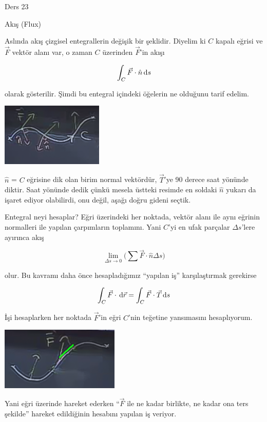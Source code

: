 \documentclass[12pt,fleqn]{article}\usepackage{../../common}
\begin{document}
Ders 23

Akış (Flux)

Aslında akış çizgisel entegrallerin değişik bir şeklidir. Diyelim ki $C$ kapalı
eğrisi ve $\vec{F}$ vektör alanı var, o zaman $C$ üzerinden $\vec{F}$'in akışı

$$ \int_C \vec{F} \cdot \hat{n} \,\mathrm{d} s $$

olarak gösterilir. Şimdi bu entegral içindeki öğelerin ne olduğunu tarif
edelim. 

\begin{center}

\includegraphics[height=3cm]{23_1.png}

\end{center}
$\hat{n}$ = $C$ eğrisine dik olan birim normal vektördür, $\vec{T}$'ye 90
derece saat yönünde diktir. Saat yönünde dedik çünkü mesela üstteki resimde
en soldaki $\hat{n}$ yukarı da işaret ediyor olabilirdi, onu değil, aşağı
doğru gideni seçtik.

Entegral neyi hesaplar? Eğri üzerindeki her noktada, vektör alanı ile aynı
eğrinin normalleri ile yapılan çarpımların toplamını. Yani $C$'yi en ufak
parçalar $\Delta s$'lere ayırınca akış

$$
\lim_{\Delta s \to 0} 
\bigg( \sum \vec{F} \cdot \hat{n}  \Delta s \bigg)
$$

olur. Bu kavramı daha önce hesapladığımız ``yapılan iş'' karşılaştırmak
gerekirse


$$ \int_C \vec{F} \cdot \,\mathrm{d}\vec{r} = \int_C \vec{F} \cdot \vec{T} \,\mathrm{d} s $$


İşi hesaplarken her noktada $\vec{F}$'in eğri $C$'nin teğetine yansımasını
hesaplıyorum. 

\begin{center}

\includegraphics[height=3cm]{23_2.png}

\end{center}
Yani eğri üzerinde hareket ederken ``$\vec{F}$ ile ne kadar birlikte, ne
kadar ona ters şekilde'' hareket edildiğinin hesabını yapılan iş veriyor. 
\end{document}
